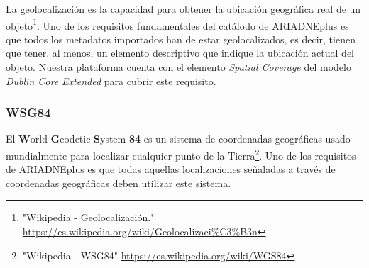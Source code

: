 \documentclass[
]{article}
\begin{document}
La geolocalización es la capacidad para obtener la ubicación geográfica
real de un objeto\footnote{"Wikipedia - Geolocalización."
  \url{https://es.wikipedia.org/wiki/Geolocalizaci\%C3\%B3n}}. Uno de
los requisitos fundamentales del catálodo de ARIADNEplus es que todos
los metadatos importados han de estar geolocalizados, es decir, tienen
que tener, al menos, un elemento descriptivo que indique la ubicación
actual del objeto. Nuestra plataforma cuenta con el elemento
\emph{Spatial Coverage} del modelo \emph{Dublin Core Extended} para
cubrir este requisito.

\hypertarget{wsg84}{%
\subsubsection{WSG84}\label{wsg84}}

El \textbf{W}orld \textbf{G}eodetic \textbf{S}ystem \textbf{84} es un
sistema de coordenadas geográficas usado mundialmente para localizar
cualquier punto de la Tierra\footnote{"Wikipedia - WSG84"
  \url{https://es.wikipedia.org/wiki/WGS84}}. Uno de los requisitos de
ARIADNEplus es que todas aquellas localizaciones señaladas a través de
coordenadas geográficas deben utilizar este sistema.
\end{document}
